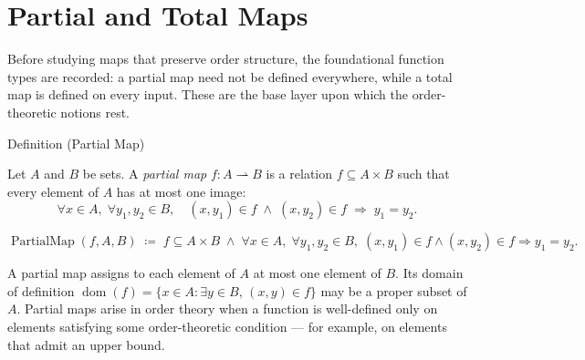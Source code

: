 
\section{Partial and Total Maps}
\label{sec:partial-total-maps}

\begin{remark*}
Before studying maps that preserve order structure, the foundational
function types are recorded: a partial map need not be defined everywhere,
while a total map is defined on every input.  These are the base layer
upon which the order-theoretic notions rest.
\end{remark*}


\begin{definitionbox}{Definition (Partial Map)}
\begin{definition}
\label{def:partial-map}
Let $A$ and $B$ be sets.  A \emph{partial map} $f : A \rightharpoonup B$
is a relation $f \subseteq A \times B$ such that every element of $A$ has
at most one image:
\[
\forall x \in A,\; \forall y_1, y_2 \in B,\quad
(x, y_1) \in f \;\land\; (x, y_2) \in f
\;\Longrightarrow\; y_1 = y_2.
\]
\end{definition}
\end{definitionbox}

\begin{remark*}
\[
\operatorname{PartialMap}(f, A, B)
\;\coloneqq\;
f \subseteq A \times B
\;\land\;
\forall x \in A,\; \forall y_1, y_2 \in B,\;
(x,y_1) \in f \land (x,y_2) \in f \Rightarrow y_1 = y_2.
\]
\end{remark*}

\begin{remark*}[Interpretation]
A partial map assigns to each element of $A$ at most one element of $B$.
Its domain of definition
$\operatorname{dom}(f) = \{x \in A : \exists y \in B,\, (x,y) \in f\}$
may be a proper subset of $A$.  Partial maps arise in order theory when
a function is well-defined only on elements satisfying some order-theoretic
condition --- for example, on elements that admit an upper bound.
\end{remark*}

